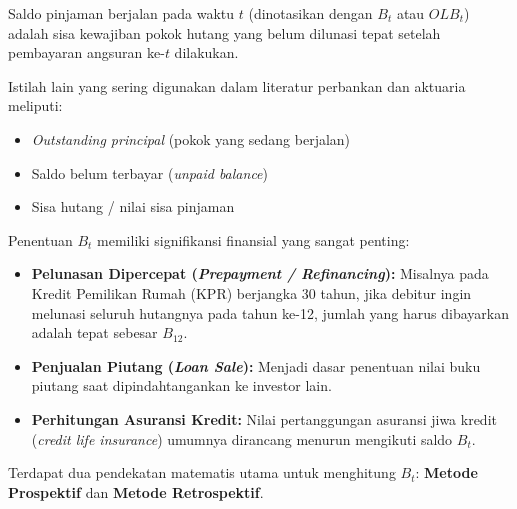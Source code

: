 \documentclass[11pt,a4paper]{article}
\begin{document}
\begin{definitionbox}
Saldo pinjaman berjalan pada waktu $t$ (dinotasikan dengan $B_t$ atau $OLB_t$) adalah sisa kewajiban pokok hutang yang belum dilunasi tepat setelah pembayaran angsuran ke-$t$ dilakukan.
\end{definitionbox}

Istilah lain yang sering digunakan dalam literatur perbankan dan aktuaria meliputi:
\begin{itemize}
    \item \textit{Outstanding principal} (pokok yang sedang berjalan)
    \item Saldo belum terbayar (\textit{unpaid balance})
    \item Sisa hutang / nilai sisa pinjaman
\end{itemize}

Penentuan $B_t$ memiliki signifikansi finansial yang sangat penting:
\begin{itemize}
    \item \textbf{Pelunasan Dipercepat (\textit{Prepayment / Refinancing}):} Misalnya pada Kredit Pemilikan Rumah (KPR) berjangka 30 tahun, jika debitur ingin melunasi seluruh hutangnya pada tahun ke-12, jumlah yang harus dibayarkan adalah tepat sebesar $B_{12}$.
    \item \textbf{Penjualan Piutang (\textit{Loan Sale}):} Menjadi dasar penentuan nilai buku piutang saat dipindahtangankan ke investor lain.
    \item \textbf{Perhitungan Asuransi Kredit:} Nilai pertanggungan asuransi jiwa kredit (\textit{credit life insurance}) umumnya dirancang menurun mengikuti saldo $B_t$.
\end{itemize}

Terdapat dua pendekatan matematis utama untuk menghitung $B_t$: \textbf{Metode Prospektif} dan \textbf{Metode Retrospektif}.
\end{document}
